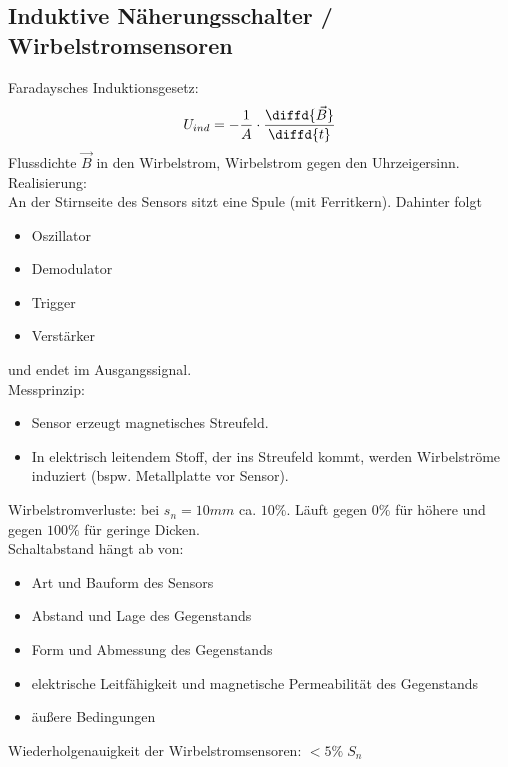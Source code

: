 \documentclass{scrreprt}
\begin{document}
\subsection{Induktive Näherungsschalter / Wirbelstromsensoren}
Faradaysches Induktionsgesetz: 
$$U_{ind}=-\frac{1}{A}\cdot \frac{\diffd{\vec{B}}}{\diffd{t}}$$
Flussdichte $\vec{B}$ in den Wirbelstrom, Wirbelstrom gegen den Uhrzeigersinn.\\
Realisierung:\\
An der Stirnseite des Sensors sitzt eine Spule (mit Ferritkern). Dahinter folgt
\begin{itemize}
\item Oszillator
\item Demodulator
\item Trigger
\item Verstärker
\end{itemize}
und endet im Ausgangssignal.\\
Messprinzip:
\begin{itemize}
\item Sensor erzeugt magnetisches Streufeld.
\item In elektrisch leitendem Stoff, der ins Streufeld kommt, werden Wirbelströme induziert (bspw. Metallplatte vor Sensor).
\end{itemize}
Wirbelstromverluste: bei $s_n=10\unit{mm}$ ca. $10\%$. Läuft gegen $0\%$ für höhere und gegen $100\%$ für geringe Dicken.\\
Schaltabstand hängt ab von:
\begin{itemize}
\item Art und Bauform des Sensors
\item Abstand und Lage des Gegenstands
\item Form und Abmessung des Gegenstands
\item elektrische Leitfähigkeit und magnetische Permeabilität des Gegenstands
\item äußere Bedingungen
\end{itemize}
Wiederholgenauigkeit der Wirbelstromsensoren: $<5\%\;S_n$
\end{document}
